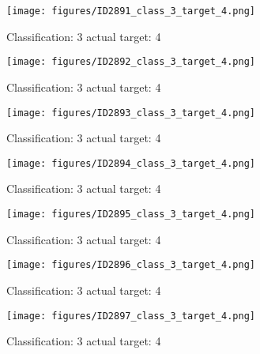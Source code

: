 \begin{figure}[h!]
\begin{center}
\texttt{[image: figures/ID2891\_class\_3\_target\_4.png]}
\end{center}
\caption{ Classification: 3 actual target: 4}
\label{fig:ID2891_class_3_target_4}
\end{figure}
\begin{figure}[h!]
\begin{center}
\texttt{[image: figures/ID2892\_class\_3\_target\_4.png]}
\end{center}
\caption{ Classification: 3 actual target: 4}
\label{fig:ID2892_class_3_target_4}
\end{figure}
\begin{figure}[h!]
\begin{center}
\texttt{[image: figures/ID2893\_class\_3\_target\_4.png]}
\end{center}
\caption{ Classification: 3 actual target: 4}
\label{fig:ID2893_class_3_target_4}
\end{figure}
\begin{figure}[h!]
\begin{center}
\texttt{[image: figures/ID2894\_class\_3\_target\_4.png]}
\end{center}
\caption{ Classification: 3 actual target: 4}
\label{fig:ID2894_class_3_target_4}
\end{figure}
\begin{figure}[h!]
\begin{center}
\texttt{[image: figures/ID2895\_class\_3\_target\_4.png]}
\end{center}
\caption{ Classification: 3 actual target: 4}
\label{fig:ID2895_class_3_target_4}
\end{figure}
\begin{figure}[h!]
\begin{center}
\texttt{[image: figures/ID2896\_class\_3\_target\_4.png]}
\end{center}
\caption{ Classification: 3 actual target: 4}
\label{fig:ID2896_class_3_target_4}
\end{figure}
\begin{figure}[h!]
\begin{center}
\texttt{[image: figures/ID2897\_class\_3\_target\_4.png]}
\end{center}
\caption{ Classification: 3 actual target: 4}
\label{fig:ID2897_class_3_target_4}
\end{figure}
